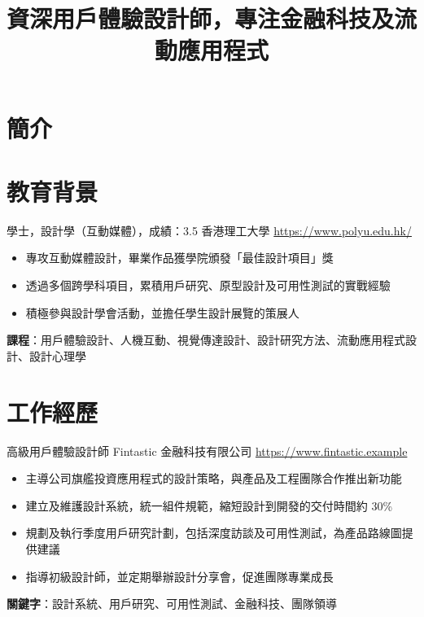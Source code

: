 \documentclass[a4paper, serif, 10pt]{moderncv}
\title{資深用戶體驗設計師，專注金融科技及流動應用程式}
\begin{document}
\maketitle

\section{簡介}

\section{教育背景}

        {學士，設計學（互動媒體），成績：3.5}
        {香港理工大學}
        {\url{https://www.polyu.edu.hk/}}
        {}
        {\begin{itemize}
\item 專攻互動媒體設計，畢業作品獲學院頒發「最佳設計項目」獎
\item 透過多個跨學科項目，累積用戶研究、原型設計及可用性測試的實戰經驗
\item 積極參與設計學會活動，並擔任學生設計展覽的策展人
\end{itemize}
\textbf{課程}：用戶體驗設計、人機互動、視覺傳達設計、設計研究方法、流動應用程式設計、設計心理學}
\section{工作經歷}

        {高級用戶體驗設計師}
        {Fintastic 金融科技有限公司}
        {\url{https://www.fintastic.example}}
        {}
        {\begin{itemize}
\item 主導公司旗艦投資應用程式的設計策略，與產品及工程團隊合作推出新功能
\item 建立及維護設計系統，統一組件規範，縮短設計到開發的交付時間約 30\%
\item 規劃及執行季度用戶研究計劃，包括深度訪談及可用性測試，為產品路線圖提供建議
\item 指導初級設計師，並定期舉辦設計分享會，促進團隊專業成長
\end{itemize}
\textbf{關鍵字}：設計系統、用戶研究、可用性測試、金融科技、團隊領導}
\end{document}
